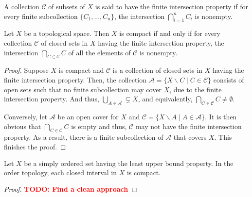 \begin{definition}
    A collection $\mathscr{C}$ of subsets of $X$ is said to have the finite intersection property if for every finite subcollection $\{C_1,\ldots,C_n\}$, the intersection $\bigcap_{i=1}^n C_i$ is nonempty.
\end{definition}

\begin{theorem}
    Let $X$ be a topological space. Then $X$ is compact if and only if for every collection $\mathscr{C}$ of closed sets in $X$ having the finite intersection property, the intersection $\bigcap_{C\in\mathscr{C}} C$ of all the elements of $\mathscr{C}$ is nonempty.
\end{theorem}
\begin{proof}
    Suppose $X$ is compact and $\mathscr{C}$ is a collection of closed sets in $X$ having the finite intersection property. Then, the collection $\mathscr{A} = \{X\backslash C\mid C\in\mathscr{C}\}$ consists of open sets such that no finite subcollection may cover $X$, due to the finite intersection property. And thus, $\bigcup_{A\in\mathscr{A}}\subsetneq X$, and equivalently, $\bigcap_{C\in\mathscr{C}}C\ne\emptyset$.

    Conversely, let $\mathscr{A}$ be an open cover for $X$ and $\mathscr{C} = \{X\backslash A\mid A\in\mathscr{A}\}$. It is then obvious that $\bigcap_{C\in\mathscr{C}} C$ is empty and thus, $\mathscr{C}$ may not have the finite intersection property. As a result, there is a finite subcollection of $\mathscr{A}$ that covers $X$. This finishes the proof.
\end{proof}

\begin{theorem}
    Let $X$ be a simply ordered set having the least upper bound property. In the order topology, each closed interval in $X$ is compact.
\end{theorem}
\begin{proof}
    \textbf{\textcolor{red}{TODO: Find a clean approach}}
\end{proof}

